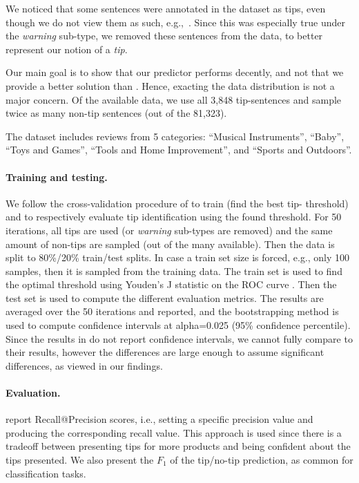 We noticed that some sentences were annotated in the dataset as tips, even though we do not view them as such, e.g.,~. Since this was especially true under the \textit{warning} sub-type, we removed these sentences from the data, to better represent our notion of a \textit{tip}.

Our main goal is to show that our predictor performs decently, and not that we provide a better solution than \citet{hirsch2021producttips}. Hence, exacting the data distribution is not a major concern. Of the available data, we use all 3,848 tip-sentences and sample twice as many non-tip sentences (out of the 81,323).

The dataset includes reviews from 5 categories: ``Musical Instruments'', ``Baby'', ``Toys and Games'', ``Tools and Home Improvement'', and ``Sports and Outdoors''.

\paragraph{Training and testing.}
We follow the cross-validation \citep{xu2001crossVal} procedure of \citet{hirsch2021producttips} to train (find the best tip-\taxtype{} threshold) and to respectively evaluate tip identification using the found threshold. For 50 iterations, all tips are used (or \textit{warning} sub-types are removed) and the same amount of non-tips are sampled (out of the many available). Then the data is split to 80\%/20\% train/test splits. In case a train set size is forced, e.g., only 100 samples, then it is sampled from the training data. The train set is used to find the optimal threshold using Youden's J statistic on the ROC curve \citep{youden1950youdenj}. Then the test set is used to compute the different evaluation metrics. The results are averaged over the 50 iterations and reported, and the bootstrapping method \citep{efron1992bootstrap} is used to compute confidence intervals at alpha=0.025 (95\% confidence percentile). Since the results in \citet{hirsch2021producttips} do not report confidence intervals, we cannot fully compare to their results, however the differences are large enough to assume significant differences, as viewed in our findings.

\paragraph{Evaluation.}
\citet{hirsch2021producttips} report Recall@Precision scores, i.e., setting a specific precision value and producing the corresponding recall value. This approach is used since there is a tradeoff between presenting tips for more products and being confident about the tips presented. We also present the $F_1$ of the tip/no-tip prediction, as common for classification tasks.








